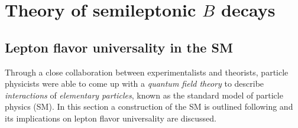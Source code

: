 


\chapter{Theory of semileptonic $B$ decays}
\label{ref:theory}

\section{Lepton flavor universality in the SM}
\label{ref:theory:lfu}

Through a close collaboration between experimentalists and theorists,
particle physicists were able to come up with a \emph{quantum field theory}
to describe \emph{interactions} of \emph{elementary particles},
known as the standard model of particle physics (SM).
In this section a construction of the SM is outlined following
\cite{Robinson_2011}
and its implications on lepton flavor universality are discussed.

